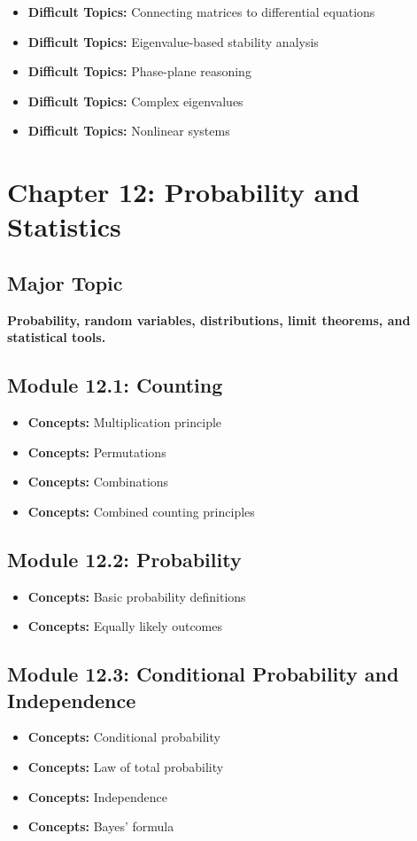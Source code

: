 \documentclass[11pt]{article}
\newcommand{\concept}[1]{\item \textbf{Concepts:} #1}
\newcommand{\difficult}[1]{\item \textbf{Difficult Topics:} #1}
\begin{document}
\begin{itemize}
    \difficult{Connecting matrices to differential equations}
    \difficult{Eigenvalue-based stability analysis}
    \difficult{Phase-plane reasoning}
    \difficult{Complex eigenvalues}
    \difficult{Nonlinear systems}
\end{itemize}


\section{Chapter 12: Probability and Statistics}

\subsection{Major Topic}

\textbf{Probability, random variables, distributions, limit theorems,
and statistical tools.}

\subsection{Module 12.1: Counting}

\begin{itemize}
    \concept{Multiplication principle}
    \concept{Permutations}
    \concept{Combinations}
    \concept{Combined counting principles}
\end{itemize}

\subsection{Module 12.2: Probability}

\begin{itemize}
    \concept{Basic probability definitions}
    \concept{Equally likely outcomes}
\end{itemize}

\subsection{Module 12.3: Conditional Probability and Independence}

\begin{itemize}
    \concept{Conditional probability}
    \concept{Law of total probability}
    \concept{Independence}
    \concept{Bayes' formula}
\end{itemize}
\end{document}

